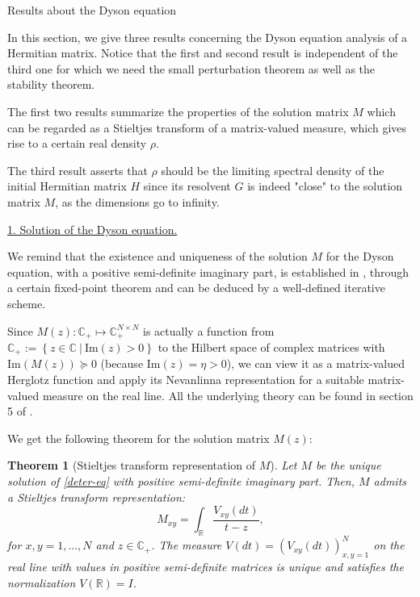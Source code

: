 \documentclass[11pt, a4paper, oneside]{book}
\numberwithin{equation}{chapter}
\newtheorem{thm}{Theorem}[section]
\begin{document}
\begin{section}{Results about the Dyson equation} \label{s:Results}

In this section, we give three results concerning the Dyson equation analysis of a Hermitian matrix. Notice that the first and second result is independent of the third one for which we need the small perturbation theorem as well as the stability theorem.

The first two results summarize the properties of the solution matrix $M$ which can be regarded as a Stieltjes transform of a matrix-valued measure, which gives rise to a certain real density $\rho$.

The third result asserts that $\rho$ should be the limiting spectral density of the initial Hermitian matrix $H$ since its resolvent $G$ is indeed "close" to the solution matrix $M$, as the dimensions go to infinity.

\underline{1. Solution of the Dyson equation.}

We remind that the existence and uniqueness of the solution $M$ for the Dyson equation, with a positive semi-definite imaginary part, is established in \cite{helton2007operator}, through a certain fixed-point theorem and can be deduced by a well-defined iterative scheme.

Since $M(z):\mathbb{C}_+ \mapsto \mathbb{C}^{N \times N}_+$ is actually a function from $\mathbb{C}_+ := \left \{ z \in \mathbb{C} \ | \ \mathrm{Im}(z) > 0 \right \}$ to the Hilbert space of complex matrices with $\mathrm{Im} (M(z)) \succeq 0$ (because $\mathrm{Im}(z) = \eta > 0$), we can view it as a matrix-valued Herglotz function and apply its Nevanlinna representation for a suitable matrix-valued measure on the real line. All the underlying theory can be found in section 5 of \cite{gesztesy2000matrix}.

\pagebreak

We get the following theorem for the solution matrix $M(z)$:
%
\begin{thm}[Stieltjes transform representation of $M$] \label{ST-M} 
    Let $M$ be the unique solution of \eqref{deter-eq} with positive semi-definite imaginary part. Then, $M$ admits a Stieltjes transform representation:
\[
M_{xy} = \int_{\mathbb{R}} \frac{V_{xy}(dt)}{t - z} ,
\]
    for $x,y=1,...,N$ and $z \in \mathbb{C}_+$. The measure $V(dt) = (V_{xy}(dt))_{x,y=1}^N$ on the real line with values in positive semi-definite matrices is unique and satisfies the normalization $V(\mathbb{R})=I$. 
\end{thm}


\end{section}
\end{document}
